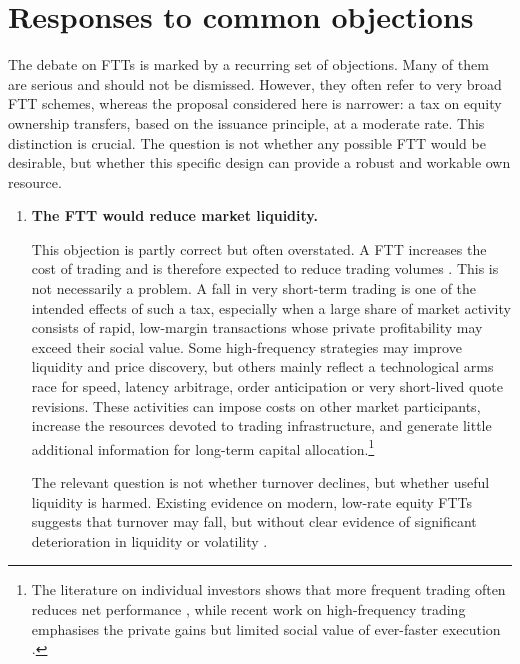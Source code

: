 \documentclass[../../main]{subfiles}
\begin{document}
\newpage

\section{Responses to common objections}

The debate on FTTs is marked by a recurring set of objections. Many of them are serious and should not be dismissed. However, they often refer to very broad FTT schemes, whereas the proposal considered here is narrower: a tax on equity ownership transfers, based on the issuance principle, at a moderate rate. This distinction is crucial. The question is not whether any possible FTT would be desirable, but whether this specific design can provide a robust and workable own resource.


\begin{enumerate}

    \item \textbf{The FTT would reduce market liquidity.}

    This objection is partly correct but often overstated. A FTT increases the cost of trading and is therefore expected to reduce trading volumes \citep{IMF2010, ColliardHoffmann2017}. This is not necessarily a problem. A fall in very short-term trading is one of the intended effects of such a tax, especially when a large share of market activity consists of rapid, low-margin transactions whose private profitability may exceed their social value. Some high-frequency strategies may improve liquidity and price discovery, but others mainly reflect a technological arms race for speed, latency arbitrage, order anticipation or very short-lived quote revisions. These activities can impose costs on other market participants, increase the resources devoted to trading infrastructure, and generate little additional information for long-term capital allocation.\footnote{The literature on individual investors  shows that more frequent trading often reduces net performance \citep{DeBondtThaler1995, Shleifer2000,Odean1999,BarberOdean2000, BarberOdean2001}, while recent work on high-frequency trading emphasises the private gains but limited social value of ever-faster execution \citep{BudishCramtonShim2015, AquilinaBudishONeill2022}.}

    The relevant question is not whether turnover declines, but whether useful liquidity is harmed. Existing evidence on modern, low-rate equity FTTs suggests that turnover may fall, but without clear evidence of significant deterioration in liquidity or volatility \citep{ColliardHoffmann2017}. 
    

\end{enumerate}
\end{document}
